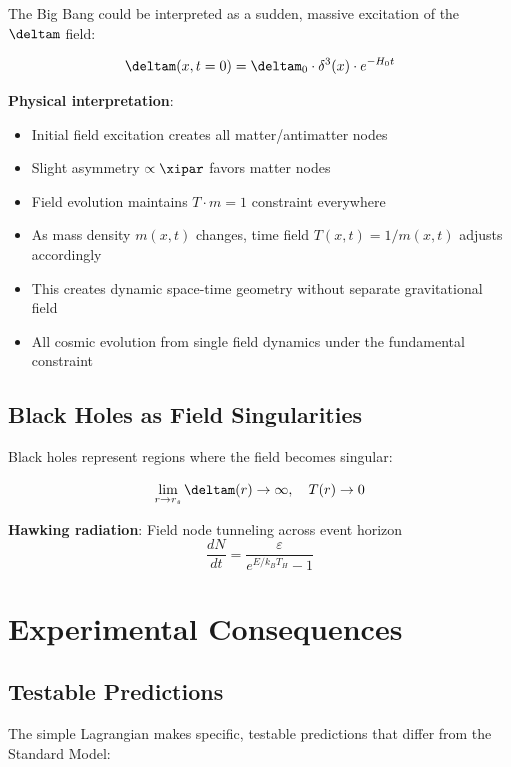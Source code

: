 	The Big Bang could be interpreted as a sudden, massive excitation of the $\deltam$ field:
	
	\begin{equation}
		\deltam(x,t=0) = \deltam_0 \cdot \delta^3(x) \cdot e^{-H_0 t}
	\end{equation}
	
	\textbf{Physical interpretation}:
	\begin{itemize}
		\item Initial field excitation creates all matter/antimatter nodes
		\item Slight asymmetry $\propto \xipar$ favors matter nodes
		\item Field evolution maintains $T \cdot m = 1$ constraint everywhere
		\item As mass density $m(x,t)$ changes, time field $T(x,t) = 1/m(x,t)$ adjusts accordingly
		\item This creates dynamic space-time geometry without separate gravitational field
		\item All cosmic evolution from single field dynamics under the fundamental constraint
	\end{itemize}
	
	\subsection{Black Holes as Field Singularities}
	
	Black holes represent regions where the field becomes singular:
	
	\begin{equation}
		\lim_{r \to r_s} \deltam(r) \to \infty, \quad T(r) \to 0
	\end{equation}
	
	\textbf{Hawking radiation}: Field node tunneling across event horizon
	\begin{equation}
		\frac{dN}{dt} = \frac{\varepsilon}{e^{E/k_B T_H} - 1}
	\end{equation}
	
	\section{Experimental Consequences}
	
	\subsection{Testable Predictions}
	
	The simple Lagrangian makes specific, testable predictions that differ from the Standard Model:
	
